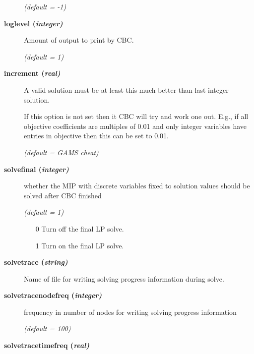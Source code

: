 \begin{description}
\textsl{(default = -1)}

\item[\label{loglevel}\hypertarget{loglevel}
{\textbf{loglevel (\slshape{integer})}}]\hspace{1.0in}

Amount of output to print by CBC.

\textsl{(default = 1)}

\item[\label{increment}\hypertarget{increment}
{\textbf{increment (\slshape{real})}}]\hspace{1.0in}

A valid solution must be at least this much better than last integer solution.

If this option is not set then it CBC will try and work one out.
E.g., if all objective coefficients are multiples of 0.01 and only integer variables have entries in objective then this can be set to 0.01.

\textsl{(default = GAMS cheat)}

\item[\label{solvefinal}\hypertarget{solvefinal}
{\textbf{solvefinal (\slshape{integer})}}]\hspace{1.0in}

whether the MIP with discrete variables fixed to solution values should be solved after CBC finished

\textsl{(default = 1)}
\begin{itemize}
\item[0] 
Turn off the final LP solve.
\item[1] 
Turn on the final LP solve.
\end{itemize}

\item[\label{solvetrace}\hypertarget{solvetrace}
{\textbf{solvetrace (\slshape{string})}}]\hspace{1.0in}

Name of file for writing solving progress information during solve.


\item[\label{solvetracenodefreq}\hypertarget{solvetracenodefreq}
{\textbf{solvetracenodefreq (\slshape{integer})}}]\hspace{1.0in}

frequency in number of nodes for writing solving progress information

\textsl{(default = 100)}

\item[\label{solvetracetimefreq}\hypertarget{solvetracetimefreq}
{\textbf{solvetracetimefreq (\slshape{real})}}]\hspace{1.0in}


\end{description}
